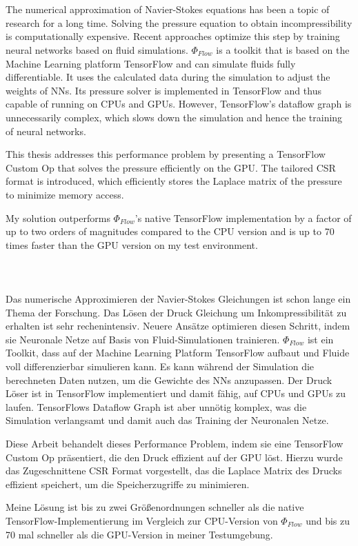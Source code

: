 \chapter{\abstractname}
\small
The numerical approximation of Navier-Stokes equations has been a topic of research for a long time. Solving the pressure equation to obtain incompressibility is computationally expensive. Recent approaches optimize this step by training neural networks based on fluid simulations. $\Phi_{Flow}$ is a toolkit that is based on the Machine Learning platform TensorFlow and can simulate fluids fully differentiable. It uses the calculated data during the simulation to adjust the weights of NNs. Its pressure solver is implemented in TensorFlow and thus capable of running on CPUs and GPUs. However, TensorFlow's dataflow graph is unnecessarily complex, which slows down the simulation and hence the training of neural networks. 
\par This thesis addresses this performance problem by presenting a TensorFlow Custom Op that solves the pressure efficiently on the GPU. The tailored CSR format is introduced, which efficiently stores the Laplace matrix of the pressure to minimize memory access. 
\par My solution outperforms $\Phi_{Flow}$'s native TensorFlow implementation by a factor of up to two orders of magnitudes compared to the CPU version and is up to 70 times faster than the GPU version on my test environment.\\\\\\\\
Das numerische Approximieren der Navier-Stokes Gleichungen ist schon lange ein Thema der Forschung. Das Lösen der Druck Gleichung um Inkompressibilität zu erhalten ist sehr rechenintensiv. Neuere Ansätze optimieren diesen Schritt, indem sie Neuronale Netze auf Basis von Fluid-Simulationen trainieren. $\Phi_{Flow}$ ist ein Toolkit, dass auf der Machine Learning Platform TensorFlow aufbaut und Fluide voll differenzierbar simulieren kann. Es kann während der Simulation die berechneten Daten nutzen, um die Gewichte des NNs anzupassen. Der Druck Löser ist in TensorFlow implementiert und damit fähig, auf CPUs und GPUs zu laufen. TensorFlows Dataflow Graph ist aber unnötig komplex, was die Simulation verlangsamt und damit auch das Training der Neuronalen Netze. 
\par Diese Arbeit behandelt dieses Performance Problem, indem sie eine TensorFlow Custom Op präsentiert, die den Druck effizient auf der GPU löst. Hierzu wurde das Zugeschnittene CSR Format vorgestellt, das die Laplace Matrix des Drucks effizient speichert, um die Speicherzugriffe zu minimieren. 
\par Meine Lösung ist bis zu zwei Größenordnungen schneller als die native TensorFlow-Implementierung  im Vergleich zur CPU-Version von $\Phi_{Flow}$ und bis zu 70 mal schneller als die GPU-Version in meiner Testumgebung.

\normalsize